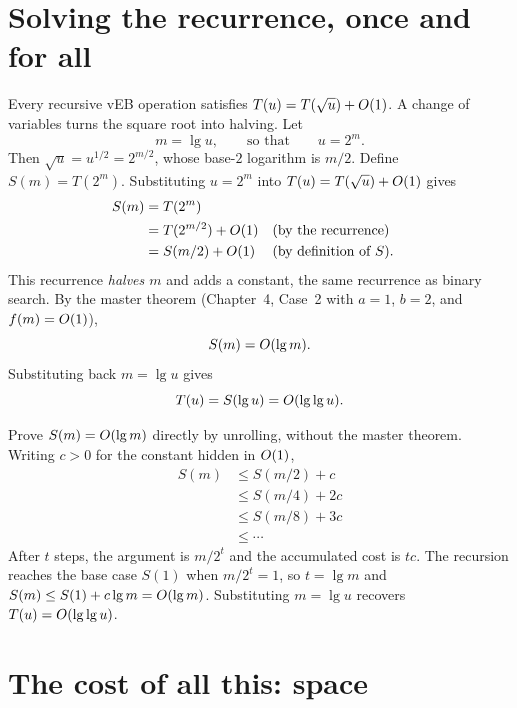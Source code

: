 \section{Solving the recurrence, once and for all}
\label{ch21:sec-recurrence}

Every recursive vEB operation satisfies $T(u) = T(\sqrt{u}) + O(1)$. A change of
variables turns the square root into halving. Let
\[
  m = \lg u, \qquad\text{so that}\qquad u = 2^m.
\]
Then $\sqrt{u} = u^{1/2} = 2^{m/2}$, whose base-$2$ logarithm is $m/2$. Define
$S(m) = T(2^m)$. Substituting $u = 2^m$ into $T(u) = T(\sqrt{u}) + O(1)$ gives
\begin{align*}
  S(m) &= T(2^m) \\
       &= T(2^{m/2}) + O(1) && \text{(by the recurrence)} \\
       &= S(m/2) + O(1) && \text{(by definition of $S$).}
\end{align*}
This recurrence \emph{halves $m$} and adds a constant, the same
recurrence as binary search. By the master theorem (Chapter~4, Case~2 with
$a=1$, $b=2$, and $f(m)=O(1)$),
\[
  S(m) = O(\lg m).
\]
Substituting back $m = \lg u$ gives
\[
  T(u) = S(\lg u) = O(\lg \lg u).
\]

\begin{walkbox}
Prove $S(m) = O(\lg m)$ directly by unrolling, without the master
theorem. Writing $c > 0$ for the constant hidden in $O(1)$,
\begin{align*}
  S(m) &\le S(m/2)+c \\
       &\le S(m/4)+2c \\
       &\le S(m/8)+3c \\
       &\le \cdots
\end{align*}
After $t$
steps, the argument is $m/2^t$ and the accumulated cost is $tc$. The recursion
reaches the base case $S(1)$ when $m/2^t = 1$, so $t = \lg m$ and
$S(m) \le S(1) + c\lg m = O(\lg m)$. Substituting $m = \lg u$ recovers
$T(u) = O(\lg\lg u)$.
\end{walkbox}

\section{The cost of all this: space}

